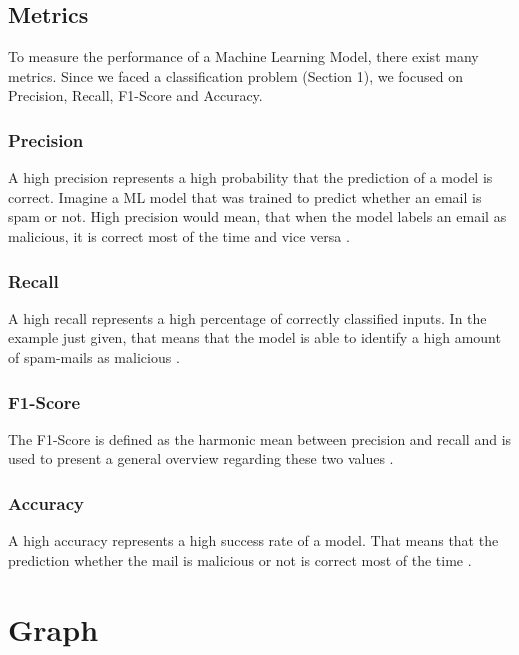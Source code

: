 	
		\subsection{Metrics}
	
			To measure the performance of a Machine Learning Model, there exist many metrics. Since we faced a classification problem (Section 1), we focused on Precision, Recall, F1-Score and Accuracy.
		
			\subsubsection{Precision}
				
				A high precision represents a high probability that the prediction of a model is correct. Imagine a ML model that was trained to predict whether an email is spam or not. High precision would mean, that when the model labels an email as malicious, it is correct most of the time and vice versa .
				
			\subsubsection{Recall}
			
				A high recall represents a high percentage of correctly classified inputs. In the example just given, that means that the model is able to identify a high amount of spam-mails as malicious .
				
			\subsubsection{F1-Score}
			
				The F1-Score is defined as the harmonic mean between precision and recall and is used to present a general overview regarding these two values .
				
			\subsubsection{Accuracy}
			
				A high accuracy represents a high success rate of a model. That means that the prediction whether the mail is malicious or not is correct most of the time .
	
	\section{Graph}
		